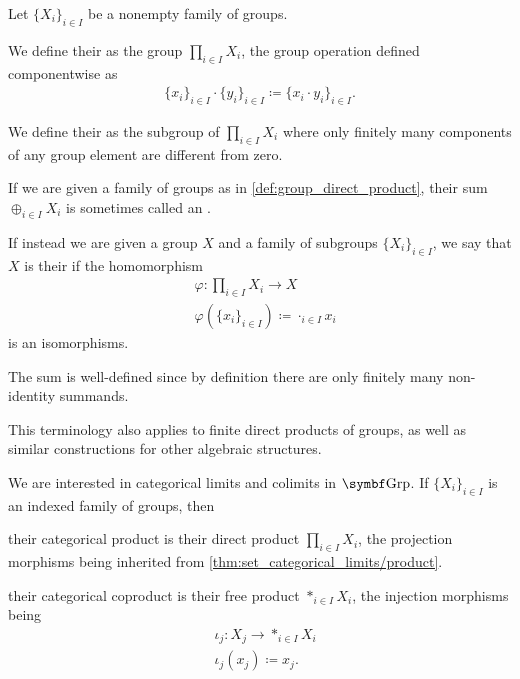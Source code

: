 \begin{definition}\label{def:group_direct_product}
  Let \( \{ X_i \}_{i \in I} \) be a nonempty family of groups.

  We define their  as the group \( \prod_{i \in I} X_i \), the group operation defined componentwise as
  \begin{align*}
    \{ x_i \}_{i \in I} \cdot \{ y_i \}_{i \in I}
    \coloneqq
    \{ x_i \cdot y_i \}_{i \in I}.
  \end{align*}

  We define their  as the subgroup of \( \prod_{i \in I} X_i \) where only finitely many components of any group element are different from zero.
\end{definition}

\begin{remark}\label{def:group_direct_sum_external_internal}\cite[126]{Knapp2016BAlg}
  If we are given a family of groups as in \cref{def:group_direct_product}, their sum \( \oplus_{i \in I} X_i \) is sometimes called an .

  If instead we are given a group \( X \) and a family of subgroups \( \{ X_i \}_{i \in I} \), we say that \( X \) is their  if the homomorphism
  \begin{align*}
    &\varphi: \prod_{i \in I} X_i \to X \\
    &\varphi(\{ x_i \}_{i \in I}) \coloneqq \cdot_{i \in I} x_i
  \end{align*}
  is an isomorphisms.

  The sum is well-defined since by definition there are only finitely many non-identity summands.

  This terminology also applies to finite direct products of groups, as well as similar constructions for other algebraic structures.
\end{remark}

\begin{proposition}\label{thm:group_categorical_limits}
  We are interested in categorical limits and colimits in \( \Cat{Grp} \). If \( \{ X_i \}_{i \in I} \) is an indexed family of groups, then
  \begin{defenum}
     their categorical product is their direct product \( \prod_{i \in I} X_i \), the projection morphisms being inherited from \cref{thm:set_categorical_limits/product}.

     their categorical coproduct is their free product \( \ast_{i \in I} X_i \), the injection morphisms being
    \begin{align*}
      &\iota_j: X_j \to \ast_{i \in I} X_i \\
      &\iota_j(x_j) \coloneqq x_j.
    \end{align*}
  \end{defenum}
\end{proposition}

